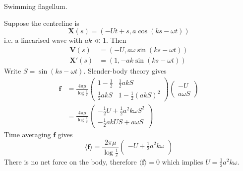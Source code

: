 \documentclass{jknotes}
\newcommand{\x}{\bm{x}}
\newcommand{\X}{\bm{X}}
\begin{document}
\begin{eg}
	Swimming flagellum. 
	
	\begin{center}
	\end{center}
			
	Suppose the centreline is
	\begin{equation}
		\bm{X}(s) = (-Ut+s, a\cos(ks-\omega t))
	\end{equation}
	i.e. a linearised wave with $a k \ll 1$. Then
	\begin{align}
		\bm{V}(s) &= (-U, a\omega\sin(ks-\omega t)) \\
		\X'(s) &= (1, -ak\sin(ks-\omega t))
	\end{align}
	Write $S = \sin(ks-\omega t)$. Slender-body theory gives
	\begin{align}
		\bm{f} &= \frac{4\pi\mu}{\log \frac{1}{\varepsilon}} \begin{pmatrix} 1-
			\frac{1}{2} & \frac{1}{2}akS \\ \frac{1}{2} akS & 1-
		\frac{1}{2}(akS)^2 \end{pmatrix} \begin{pmatrix} -U \\ a\omega S
		\end{pmatrix} \\
		&= \frac{4\pi \mu}{\log \frac{1}{\varepsilon}}\begin{pmatrix}
		-\frac{1}{2}U + \frac{1}{2}a^2k\omega S^2 \\ -\frac{1}{2}akUS + a\omega S
	\end{pmatrix}
	\end{align}
	Time averaging $\bm{f}$ gives
	\begin{equation}
		\langle \bm{f}\rangle = \frac{2\pi\mu}{\log \frac{1}{\varepsilon}}
	\begin{pmatrix} -U + \frac{1}{2}a^2k\omega \\ \end{pmatrix}
	\end{equation}
	There is no net force on the body, therefore $\langle \bm{f}\rangle = 0$
	which implies $U = \frac{1}{2}a^2k\omega$.
\end{eg}

\end{document}
